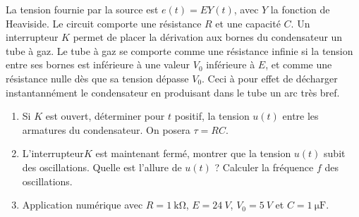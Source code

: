 	\begin{exercice}
		La tension fournie par la source est $e(t) = E Y(t)$, avec $Y$ la fonction de Heaviside. Le circuit comporte une résistance $R$ et une capacité $C$. Un interrupteur $K$ permet de placer la dérivation aux bornes du condensateur un tube à gaz. Le tube à gaz se comporte comme une résistance infinie si la tension entre ses bornes est inférieure à une valeur $V_0$ inférieure à $E$, et comme une résistance nulle dès que sa tension dépasse $V_0$. Ceci à pour effet de décharger instantannément le condensateur en produisant dans le tube un arc très bref.

		\begin{enumerate}
			\item Si $K$ est ouvert, déterminer pour $t$ positif, la tension $u(t)$ entre les armatures du condensateur. On posera $\tau = RC$.
			\item L'interrupteur$K$ est maintenant fermé, montrer que la tension $u(t)$ subit des oscillations. Quelle est l'allure de $u(t)$ ? Calculer la fréquence $f$ des oscillations.
			\item Application numérique avec $R=\SI{1}{\kilo\ohm}$, $E=\SI{24}{V}$, $V_0=\SI{5}{V}$ et $C=\SI{1}{\micro\farad}$.
		\end{enumerate}
	\end{exercice}
